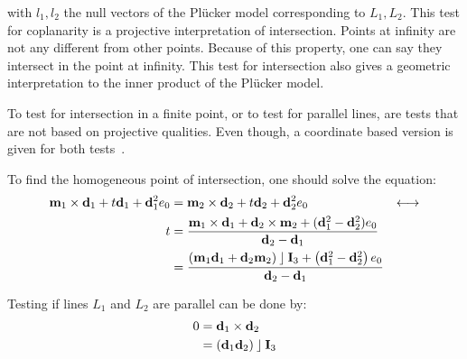 with $l_1, l_2$ the null vectors of the Pl\"ucker model corresponding to $L_1, L_2$.  This test for coplanarity is a projective interpretation of intersection.  Points at infinity are not any different from other points.  Because of this property, one can say they intersect in the point at infinity.  This test for intersection also gives a geometric interpretation to the inner product of the Pl\"ucker model.

To test for intersection in a finite point, or to test for parallel lines, are tests that are not based on projective qualities.  Even though, a coordinate based version is given for both tests~\cite{Shoemake}.

To find the homogeneous point of intersection, one should solve the equation:
\begin{align*}
  \mathbf{m}_1 \times \mathbf{d}_1 + t \mathbf{d}_1 + \mathbf{d}_1^2 e_0 &= \mathbf{m}_2 \times \mathbf{d}_2 + t \mathbf{d}_2 + \mathbf{d}_2^2 e_0 &\longleftrightarrow \\
  t &= \frac{\mathbf{m}_1 \times \mathbf{d}_1 + \mathbf{d}_2 \times \mathbf{m}_2 + (\mathbf{d}_1^2 - \mathbf{d}_2^2) e_0}{\mathbf{d}_2 - \mathbf{d}_1} \\
  &= \frac{\left( \mathbf{m}_1 \mathbf{d}_1 + \mathbf{d}_2 \mathbf{m}_2 \right) \mathbin{\rfloor} \mathbf{I}_3 + \left( \mathbf{d}_1^2 - \mathbf{d}_2^2 \right) e_0} {\mathbf{d}_2 - \mathbf{d}_1}
\end{align*}

Testing if lines $L_1$ and $L_2$ are parallel can be done by: 
\begin{align*}
  0 &= \mathbf{d}_1 \times \mathbf{d}_2 \\
    &= \left( \mathbf{d}_1 \mathbf{d}_2 \right) \mathbin{\rfloor} \mathbf{I}_3
\end{align*}

